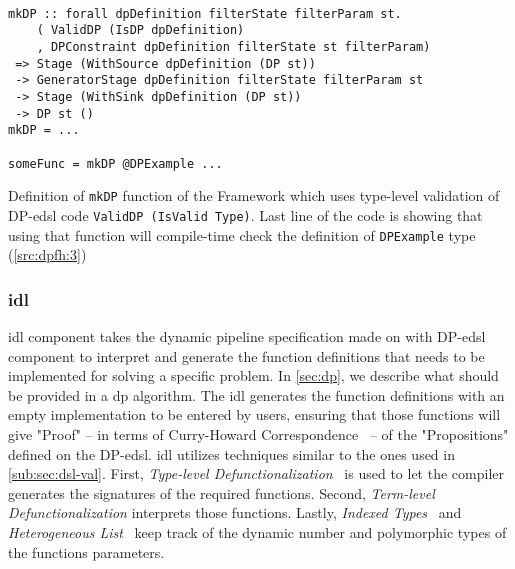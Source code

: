 \begin{listing}[H]
  \begin{verbatim}

mkDP :: forall dpDefinition filterState filterParam st.
    ( ValidDP (IsDP dpDefinition)
    , DPConstraint dpDefinition filterState st filterParam)
 => Stage (WithSource dpDefinition (DP st)) 
 -> GeneratorStage dpDefinition filterState filterParam st  
 -> Stage (WithSink dpDefinition (DP st))  
 -> DP st ()
mkDP = ...

someFunc = mkDP @DPExample ...

  \end{verbatim}
  \caption[{[\texttt{Stage.hs}] Using validation of \acrshort{dp} encoded in $G_{dsl}$}]{Definition of \texttt{mkDP} function of the Framework which uses type-level validation of DP-\acrshort{edsl} code \texttt{ValidDP (IsValid Type)}. Last line of the code is showing that using that function will compile-time check the definition of \texttt{DPExample} type (\autoref{src:dpfh:3})}
  \label{src:dpfh:5}
\end{listing}

\subsubsection{\texorpdfstring{\acrfull{idl}}{Lg}}
\acrshort{idl} component takes the dynamic pipeline specification made on with DP-\acrshort{edsl} component to interpret and generate the function definitions that needs to be implemented for solving a specific problem. In \autoref{sec:dp}, we describe what should be provided in a \acrshort{dp} algorithm. %
The \acrshort{idl} generates the function definitions with an empty implementation to be entered by users, ensuring that those functions will give "Proof" -- in terms of Curry-Howard Correspondence~\cite{curryhoward} --  of the "Propositions" defined on the DP-\acrshort{edsl}.
\acrshort{idl} utilizes techniques similar to the ones used in \autoref{sub:sec:dsl-val}. First, \emph{Type-level Defunctionalization}~\cite{defunctionalization, fun-type-function-haskell} is used to let the compiler generates the signatures of the required functions. 
Second, \emph{Term-level Defunctionalization} interprets those functions.
Lastly, \emph{Indexed Types}~\cite{type-index} and \emph{Heterogeneous List}~\cite{hlist} keep track of the dynamic number and polymorphic types of the functions parameters. 

